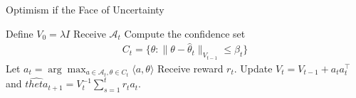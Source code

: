 \documentclass[11pt]{article}
\newcommand{\mc}[1]{\mathcal{#1}}
\newcommand{\1}[1]{\mathbf{1}\left\{#1\right\}}
\begin{document}
\begin{algorithm}
\caption{Optimism if the Face of Uncertainty}\label{alg:cap}
\begin{algorithmic}
\State Define $V_0 = \lambda I$
    \State Receive $\mc{A}_t$
    \State Compute the confidence set 
    \begin{align*}
        C_t = \{\theta:\|\theta - \hat{\theta}_t\|_{V_{t-1}} \leq \beta_t\} 
    \end{align*}
    \State Let $a_t = \arg\max_{a\in \mc{A}_t, \theta\in C_t} \langle a, \theta\rangle $ 
    \State Receive reward $r_t$.
    \State Update $V_{t} = V_{t-1} + a_t a_t^{\top}$ and $\hat{theta}_{t+1} = V_t^{-1}\sum_{s=1}^{t} r_t a_t$.
\EndFor
\end{algorithmic}
\end{algorithm}
\end{document}
